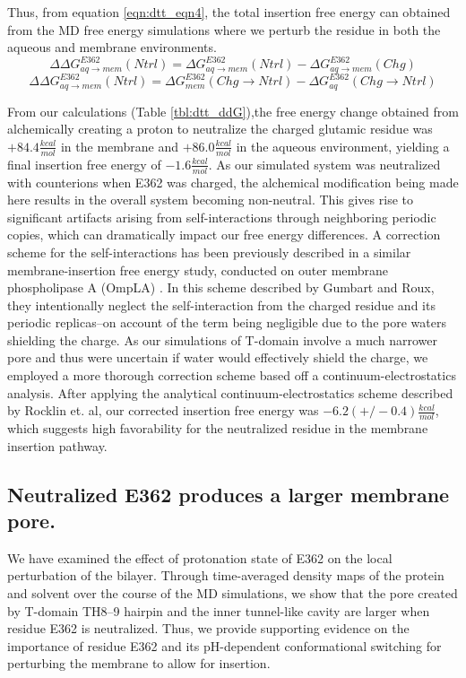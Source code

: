 Thus, from equation \ref{eqn:dtt_eqn4}, the total insertion free energy can obtained from the MD free energy simulations where we perturb the residue in both the aqueous and membrane environments.
\begin{equation}
  \Delta\Delta G_{aq\rightarrow mem}^{E362}(Ntrl)  =  \Delta G_{aq\rightarrow mem}^{E362}(Ntrl) - \Delta G_{aq\rightarrow mem}^{E362}(Chg)
  \label{eqn:dtt_eqn3}
\end{equation}
\begin{equation}
  \Delta\Delta G_{aq\rightarrow mem}^{E362}(Ntrl)  =  \Delta G_{mem}^{E362}(Chg\rightarrow Ntrl) - \Delta G_{aq}^{E362}(Chg\rightarrow Ntrl)
  \label{eqn:dtt_eqn4}
\end{equation}

From our calculations (Table \ref{tbl:dtt_ddG}),the free energy change obtained from alchemically creating a proton to neutralize the charged glutamic residue was $+84.4\frac{kcal}{mol}$ in the membrane and $+86.0\frac{kcal}{mol}$ in the aqueous environment, yielding a final insertion free energy of $-1.6\frac{kcal}{mol}$.
As our simulated system was neutralized with counterions when E362 was charged, the alchemical modification being made here results in the overall system becoming non-neutral.
This gives rise to significant artifacts arising from self-interactions through neighboring periodic copies, which can dramatically impact our free energy differences\cite{rocklin2013calculating}.
A correction scheme for the self-interactions has been previously described in a similar membrane-insertion free energy study, conducted on outer membrane phospholipase A (OmpLA) \cite{gumbart2012determination}.
In this scheme described by Gumbart and Roux, they intentionally neglect the self-interaction from the charged residue and its periodic replicas--on account of the term being negligible due to the pore waters shielding the charge.
As our simulations of T-domain involve a much narrower pore and thus were uncertain if water would effectively shield the charge, we employed a more thorough correction scheme based off a continuum-electrostatics analysis\cite{rocklin2013calculating}.
After applying the analytical continuum-electrostatics scheme described by Rocklin et. al, our corrected insertion free energy was $-6.2 (+/-0.4)\frac{kcal}{mol}$, which suggests high favorability for the neutralized residue in the membrane insertion pathway.

\subsection{Neutralized E362 produces a larger membrane pore.}
We have examined the effect of protonation state of E362 on the local perturbation of the bilayer. 
Through time-averaged density maps of the protein and solvent over the course of the MD simulations, we show that the pore created by T-domain TH8–9 hairpin and the inner tunnel-like cavity are larger when residue E362 is neutralized. 
Thus, we provide supporting evidence on the importance of residue E362 and its pH-dependent conformational switching for perturbing the membrane to allow for insertion.

